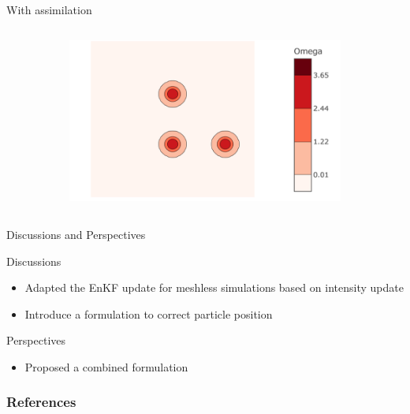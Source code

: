 \documentclass[aspectratio=169]{beamer} %
\begin{document}
\begin{frame}{With assimilation}
\begin{columns}
\begin{column}{0.5\textwidth}
\begin{figure}
\begin{subfigure}{\textwidth}
                \end{subfigure}
                \begin{subfigure}{\textwidth}
                    \centering
                    \includegraphics[width=\textwidth]{images/vorticity_field.png}
                \end{subfigure}
            \end{figure}
        \end{column}
    \end{columns}
\end{frame}

\begin{frame}{Discussions and Perspectives}

    \begin{block}{Discussions}
        \begin{itemize}
            \item Adapted the EnKF update for meshless simulations based on intensity update
            \item Introduce a formulation to correct particle position
        \end{itemize}
    \end{block}

    \begin{block}{Perspectives}
        \begin{itemize}
            \item Proposed a combined formulation
        \end{itemize}
    \end{block}
\end{frame}

\closingframe

\begin{frame}
    \frametitle{References}
    \printbibliography %
\end{frame}

\end{document}
